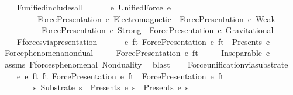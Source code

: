 \begin{isabellebody}
\ \ \ \ F{}{\isacharunderscore}{\kern0pt}unified{\isacharunderscore}{\kern0pt}includes{\isacharunderscore}{\kern0pt}all{\isacharcolon}{\kern0pt}\isanewline
\ \ \ \ \ \ {\isachardoublequoteopen}{\isasymforall}e{\isachardot}{\kern0pt}\ UnifiedForce\ e\ {\isasymlongrightarrow}\isanewline
\ \ \ \ \ \ \ \ \ {\isacharparenleft}{\kern0pt}ForcePresentation\ e\ Electromagnetic\ {\isasymor}\ ForcePresentation\ e\ Weak\ {\isasymor}\isanewline
\ \ \ \ \ \ \ \ \ \ ForcePresentation\ e\ Strong\ {\isasymor}\ ForcePresentation\ e\ Gravitational{\isacharparenright}{\kern0pt}{\isachardoublequoteclose}\ \isanewline
\ \ \ \ F{}{\isacharunderscore}{\kern0pt}forces{\isacharunderscore}{\kern0pt}via{\isacharunderscore}{\kern0pt}presentation{\isacharcolon}{\kern0pt}\isanewline
\ \ \ \ \ \ {\isachardoublequoteopen}{\isasymforall}e\ ft{\isachardot}{\kern0pt}\ ForcePresentation\ e\ ft\ {\isasymlongrightarrow}\ Presents\ e\ {\isasymOmega}{\isachardoublequoteclose}\isanewline
\isanewline
\ \ \isamarkupfalse%
\ Force{\isacharunderscore}{\kern0pt}phenomena{\isacharunderscore}{\kern0pt}nondual{\isacharcolon}{\kern0pt}\isanewline
\ \ \ \ \ {\isachardoublequoteopen}ForcePresentation\ e\ ft{\isachardoublequoteclose}\isanewline
\ \ \ \ \ {\isachardoublequoteopen}Inseparable\ e\ {\isasymOmega}{\isachardoublequoteclose}\isanewline
%
\isadelimproof
\ \ \ \ %
\endisadelimproof
%
\isatagproof
{}\isamarkupfalse%
\ assms\ F{}{\isacharunderscore}{\kern0pt}forces{\isacharunderscore}{\kern0pt}phenomenal\ Nonduality\ \isamarkupfalse%
\ blast%
\endisatagproof
{\isafoldproof}%
%
\isadelimproof
\isanewline
%
\endisadelimproof
\isanewline
\ \ \isamarkupfalse%
\ Force{\isacharunderscore}{\kern0pt}unification{\isacharunderscore}{\kern0pt}via{\isacharunderscore}{\kern0pt}substrate{\isacharcolon}{\kern0pt}\isanewline
\ \ \ \ {\isachardoublequoteopen}{\isasymforall}e{}\ e{}\ ft{}\ ft{}{\isachardot}{\kern0pt}\ ForcePresentation\ e{}\ ft{}\ {\isasymand}\ ForcePresentation\ e{}\ ft{}\isanewline
\ \ \ \ \ \ \ {\isasymlongrightarrow}\ {\isacharparenleft}{\kern0pt}{\isasymexists}s{\isachardot}{\kern0pt}\ Substrate\ s\ {\isasymand}\ Presents\ e{}\ s\ {\isasymand}\ Presents\ e{}\ s{\isacharparenright}{\kern0pt}{\isachardoublequoteclose}\isanewline
%
\isadelimproof
\ \ %
\endisadelimproof
%
\isatagproof
{}\isamarkupfalse%

\end{isabellebody}
